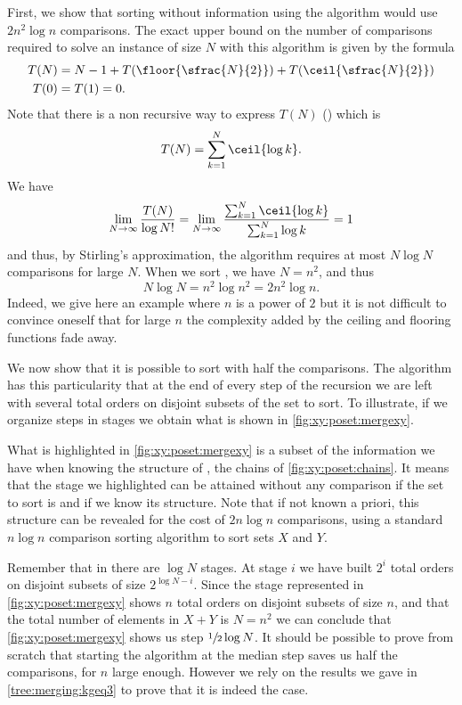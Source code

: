 First, we show that sorting \XY without information using the \mergesort algorithm would use $2
n^2 \log n$ comparisons. The exact upper bound on the number
of comparisons required to solve an instance of size \(N\) with this algorithm
is given by the formula
\begin{align*}
T(N) &= N - 1 + T(\floor{\sfrac{N}{2}}) + T(\ceil{\sfrac{N}{2}})\\
T(0) &= T(1) = 0.
\end{align*}
Note that there is a non recursive way to express \(T(N)\) (\citet*{OEIS:A001855}) which is
\begin{displaymath}
T(N) = \sum_{k=1}^{N} \ceil{\log k}.
\end{displaymath}
We have
\begin{displaymath}
\lim_{N\to\infty}\frac{T(N)}{\log N!} =
\lim_{N\to\infty}\frac{\sum_{k=1}^{N}\ceil{\log k}}{ \sum_{k=1}^{N} \log k} = 1
\end{displaymath}
and thus, by Stirling's approximation, the \mergesort algorithm requires at
most \(N \log N\) comparisons for large \(N\). When we sort \XY, we have \(N =
n^2\), and thus
\[N \log N = n^2 \log n^2 = 2 n^2 \log n.\]
Indeed, we give here an example where \(n\) is a power of \(2\) but it is not
difficult to convince oneself that for large \(n\) the complexity added
by the ceiling and flooring functions fade away.

We now show that it is possible to sort \XY with half the comparisons. The
\mergesort algorithm has this particularity that at the end of every step of
the recursion we are left with several total orders on disjoint subsets of the
set to sort. To illustrate, if we organize steps in stages we obtain what is
shown in \ref{fig:xy:poset:mergexy}.

What is highlighted in \ref{fig:xy:poset:mergexy} is a subset of the
information we have when knowing the structure of \XY, \ie the chains of
\ref{fig:xy:poset:chains}. It means that the stage we
highlighted can be attained without any comparison if the set to sort is \XY
and if we know its structure. Note that if not known a priori, this structure
can be revealed for the cost of \(2n \log n\) comparisons, using a standard \(n
\log n\) comparison sorting algorithm to sort sets \(X\) and \(Y\).

Remember that in \mergesort there are $\log N$ stages. At stage $i$ we have
built $2^{i}$ total orders on disjoint subsets of size $2^{\log N - i}$. Since
the stage represented in \ref{fig:xy:poset:mergexy} shows $n$ total orders on
disjoint subsets of size $n$, and that the total number of elements in $X+Y$ is
$N = n^2$ we can conclude that \ref{fig:xy:poset:mergexy} shows us step
$\sfrac{1}{2} \log N$. It should be possible to prove from scratch that
starting the algorithm at the median step saves us half the comparisons, for
\(n\) large enough. However we rely on the results we gave
in \ref{tree:merging:kgeq3} to prove that it is indeed the case.

